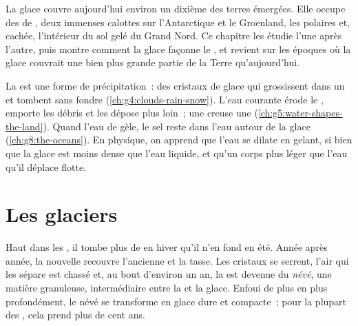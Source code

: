 La glace couvre aujourd'hui environ un dixième des terres émergées. Elle
occupe des  de , deux immenses calottes sur l'Antarctique et
le Groenland, les  polaires et, cachée, l'intérieur du sol gelé du
Grand Nord. Ce chapitre les étudie l'une après l'autre, puis montre comment
la glace façonne le , et revient sur les époques où la glace
couvrait une bien plus grande partie de la Terre qu'aujourd'hui.

\begin{recall}
La  est une forme de précipitation~: des cristaux de glace qui
grossissent dans un  et tombent sans fondre
(\cref{ch:g4:clouds-rain-snow}). L'eau courante érode le , emporte
les débris et les dépose plus loin~; une  creuse une 
(\cref{ch:g5:water-shapes-the-land}). Quand l'eau de  gèle, le sel reste
dans l'eau autour de la glace (\cref{ch:g8:the-oceans}). En physique, on
apprend que l'eau se dilate en gelant, si bien que la glace est moins
dense que l'eau liquide, et qu'un corps plus léger que l'eau qu'il déplace
flotte.
\end{recall}

\section{Les glaciers}

Haut dans les , il tombe plus de  en hiver qu'il n'en fond
en été. Année après année, la  nouvelle recouvre l'ancienne et la
tasse. Les cristaux se serrent, l'air qui les sépare est chassé et, au
bout d'environ un an, la  est devenue du \emph{névé}, une matière
granuleuse, intermédiaire entre la  et la glace. Enfoui de plus en
plus profondément, le névé se transforme en glace dure et compacte~; pour
la plupart des , cela prend plus de cent ans.

